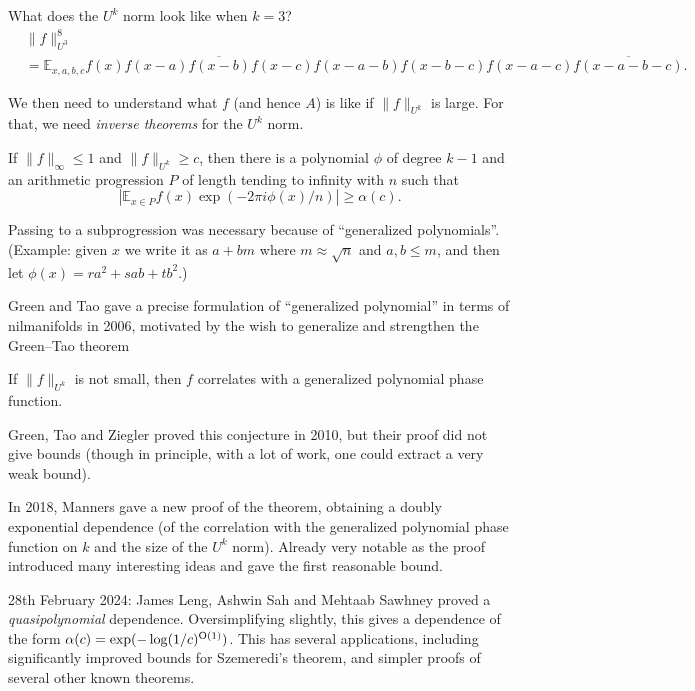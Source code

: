 \documentclass[reqno]{amsart} 
\begin{document}
What does the $U^k$ norm look like when $k = 3$?
\begin{align*}
  &\lVert f \rVert_{U^3}^8 \\
  &= \mathbb{E}_{x, a,b,c}
    f(x) \overline{f(x - a) f(x - b) f(x - c)}
    f(x - a - b)
    f(x - b - c)
    f(x - a - c)
    \overline{f(x - a - b - c)}.
\end{align*}

We then need to understand what $f$ (and hence $A$) is like if $\lVert f \rVert_{U^k}$ is large.  For that, we need \emph{inverse theorems} for the $U^k$ norm.

\begin{theorem}
  If $\lVert f \rVert_\infty \leq 1$ and $\lVert f \rVert_{U^k} \geq c$, then there is a polynomial $\phi$ of degree $k - 1$ and an arithmetic progression $P$ of length tending to infinity with $n$ such that
  \begin{equation*}
    \left| \mathbb{E}_{x \in P} f(x) \exp(- 2 \pi i \phi(x) / n) \right| \geq \alpha(c).
  \end{equation*}
\end{theorem}
Passing to a subprogression was necessary because of ``generalized polynomials''.  (Example: given $x$ we write it as $a + b m$ where $m \approx \sqrt{n}$ and $a, b \leq m$, and then let $\phi(x) = r a^2 + s a b + t b^2$.)

Green and Tao gave a precise formulation of ``generalized polynomial'' in terms of nilmanifolds in 2006, motivated by the wish to generalize and strengthen the Green--Tao theorem

\begin{conjecture}
  If $\lVert f \rVert_{U^k}$ is not small, then $f$ correlates with a generalized polynomial phase function.
\end{conjecture}

Green, Tao and Ziegler proved this conjecture in 2010, but their proof did not give bounds (though in principle, with a lot of work, one could extract a very weak bound).

In 2018, Manners gave a new proof of the theorem, obtaining a doubly exponential dependence (of the correlation with the generalized polynomial phase function on $k$ and the size of the $U^k$ norm).  Already very notable as the proof introduced many interesting ideas and gave the first reasonable bound.

28th February 2024: James Leng, Ashwin Sah and Mehtaab Sawhney proved a \emph{quasipolynomial} dependence.  Oversimplifying slightly, this gives a dependence of the form $\alpha(c) = \exp(- \log(1/c)^{\operatorname{O}(1)})$.  This has several applications, including significantly improved bounds for Szemeredi's theorem, and simpler proofs of several other known theorems.
\end{document}
